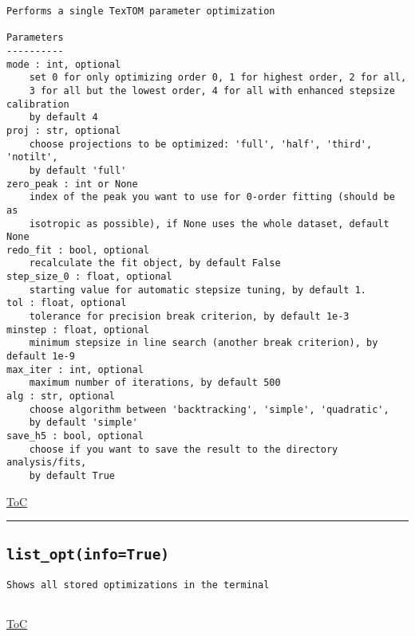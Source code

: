 \documentclass{article}
\begin{document}
\begin{lstlisting}[language=docstring]
Performs a single TexTOM parameter optimization

Parameters
----------
mode : int, optional
    set 0 for only optimizing order 0, 1 for highest order, 2 for all,
    3 for all but the lowest order, 4 for all with enhanced stepsize calibration
    by default 4
proj : str, optional
    choose projections to be optimized: 'full', 'half', 'third', 'notilt', 
    by default 'full'
zero_peak : int or None
    index of the peak you want to use for 0-order fitting (should be as
    isotropic as possible), if None uses the whole dataset, default None
redo_fit : bool, optional
    recalculate the fit object, by default False
step_size_0 : float, optional
    starting value for automatic stepsize tuning, by default 1.
tol : float, optional
    tolerance for precision break criterion, by default 1e-3
minstep : float, optional
    minimum stepsize in line search (another break criterion), by default 1e-9
max_iter : int, optional
    maximum number of iterations, by default 500
alg : str, optional
    choose algorithm between 'backtracking', 'simple', 'quadratic', 
    by default 'simple'
save_h5 : bool, optional
    choose if you want to save the result to the directory analysis/fits, 
    by default True    
\end{lstlisting}

\begin{flushright}

\hyperref[toc]{ToC}

\end{flushright}



\vspace{5mm}

\hrule

\subsection*{\texttt{list\_opt(info=True)}}
\label{fun:listopt}

\begin{lstlisting}[language=docstring]
Shows all stored optimizations in the terminal
    
\end{lstlisting}

\begin{flushright}

\hyperref[toc]{ToC}

\end{flushright}
\end{document}
